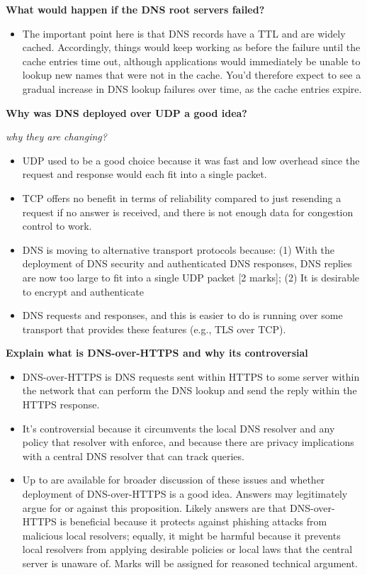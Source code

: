 \documentclass{article}
\begin{document}
\textbf{What would happen if the DNS root servers failed?}
\begin{itemize}
    \item The important point here is that DNS records have a TTL and are widely
    cached. Accordingly, things would keep working as before the failure until
    the cache entries time out, although applications would immediately be unable
    to lookup new names that were not in the cache. You'd therefore expect to
    see a gradual increase in DNS lookup failures over time, as the cache entries expire.
\end{itemize}

\textbf{Why was DNS deployed over UDP a good idea?}

\textit{why they are changing?}
\begin{itemize}
    \item UDP used to be a good choice because it was fast and low overhead since the
    request and response would each fit into a single packet.
    \item TCP offers no benefit in terms of reliability compared to just resending a request if no answer is received, and there is not enough data for congestion control to work.
    \item DNS is moving to alternative transport protocols because: (1) With the deployment
    of DNS security and authenticated DNS responses, DNS replies are now too large to
    fit into a single UDP packet [2 marks]; (2) It is desirable to encrypt and authenticate
    \item DNS requests and responses, and this is easier to do is running over some transport that
    provides these features (e.g., TLS over TCP).
\end{itemize}

\textbf{Explain what is DNS-over-HTTPS and why its controversial}

\begin{itemize}
    \item DNS-over-HTTPS is DNS requests sent within HTTPS to some server within
    the network that can perform the DNS lookup and send the reply within the HTTPS
    response.
    \item It's controversial because it circumvents the local DNS resolver and any policy that
    resolver with enforce, and because there are privacy implications with a
    central DNS resolver that can track queries.
    \item Up to are available for broader discussion of these issues and whether
    deployment of DNS-over-HTTPS is a good idea. Answers may legitimately argue for
    or against this proposition. Likely answers are that DNS-over-HTTPS is beneficial
    because it protects against phishing attacks from malicious local resolvers; equally, it
    might be harmful because it prevents local resolvers from applying desirable policies or
    local laws that the central server is unaware of. Marks will be assigned for reasoned
    technical argument.
\end{itemize}
\end{document}
